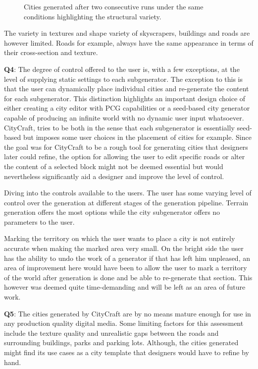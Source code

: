 \begin{figure}[h!]
\begin{subfigure}[b]{0.45\textwidth}
  \end{subfigure}
  \caption{Cities generated after two consecutive runs under the same conditions highlighting the structural variety.}
  \label{fig:discussion_city_layout_variety}
\end{figure}

The variety in textures and shape variety of skyscrapers, buildings and roads are however limited.
Roads for example, always have the same appearance in terms of their cross-section and texture.


\textbf{Q4}:
The degree of control offered to the user is, with a few exceptions, at the level of supplying static settings to each subgenerator.
The exception to this is that the user can dynamically place individual cities and re-generate the content for each subgenerator.
This distinction highlights an important design choice of either creating a city editor with PCG capabilities or a seed-based city generator capable of producing an infinite world with no dynamic user input whatsoever.
CityCraft, tries to be both in the sense that each subgenerator is essentially seed-based but imposes some user choices in the placement of cities for example.
Since the goal was for CityCraft to be a rough tool for generating cities that designers later could refine, the option for allowing the user to edit specific roads or alter the content of a selected block might not be deemed essential but would nevertheless significantly aid a designer and improve the level of control.

Diving into the controls available to the users.
The user has some varying level of control over the generation at different stages of the generation pipeline.
Terrain generation offers the most options while the city subgenerator offers no parameters to the user. 

Marking the territory on which the user wants to place a city is not entirely accurate when making the marked area very small. 
On the bright side the user has the ability to undo the work of a generator if that has left him unpleased, an area of improvement here would have been to allow the user to mark a territory of the world after generation is done and be able to re-generate that section.
This however was deemed quite time-demanding and will be left as an area of future work. 

\textbf{Q5}:
The cities generated by CityCraft are by no means mature enough for use in any production quality digital media.
Some limiting factors for this assessment include the texture quality and unrealistic gaps between the roads and surrounding buildings, parks and parking lots.
Although, the cities generated might find its use cases as a city template that designers would have to refine by hand.

